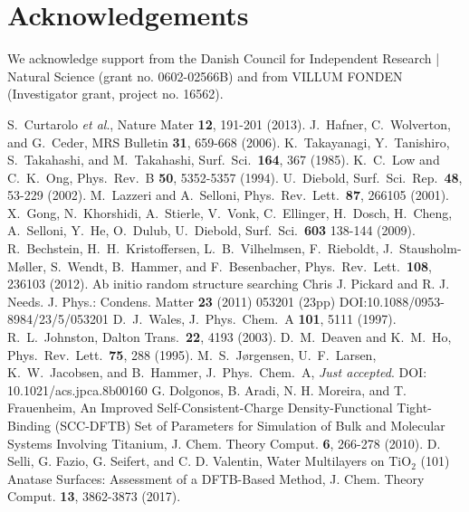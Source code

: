 \documentclass[aip,amsmath,amssymb,reprint]{revtex4-1}
\begin{document}
\section{Acknowledgements}

We acknowledge support from the Danish Council for Independent Research | Natural Science (grant no. 0602-02566B) and from VILLUM FONDEN (Investigator grant, project no. 16562).

\begin{thebibliography}{12}  
 S.\ Curtarolo \textit{et al}., Nature Mater \textbf{12}, 191-201 (2013).
 J.\ Hafner, C.\ Wolverton, and G.\ Ceder, MRS Bulletin \textbf{31}, 659-668 (2006).
K.\ Takayanagi, Y.\ Tanishiro, S.\ Takahashi, and M.\ Takahashi, Surf.\ Sci.\ \textbf{164}, 367 (1985).
K.\ C.\ Low and C.\ K.\ Ong, Phys.\ Rev.\ B \textbf{50}, 5352-5357 (1994).
U.\ Diebold, Surf.\ Sci.\ Rep.\ \textbf{48}, 53-229 (2002).
M.\ Lazzeri and A.\ Selloni, Phys.\ Rev.\ Lett.\ \textbf{87}, 266105 (2001).
X.\ Gong, N.\ Khorshidi, A.\ Stierle, V.\ Vonk, C.\ Ellinger, H.\ Dosch, H.\ Cheng, A.\ Selloni, Y.\ He, O.\ Dulub, U.\ Diebold, Surf.\ Sci.\ \textbf{603} 138-144 (2009).
R.\ Bechstein, H.\ H.\ Kristoffersen, L.\ B.\ Vilhelmsen, F.\ Rieboldt, J.\ Stausholm-M{\o}ller, S.\ Wendt, B.\ Hammer, and F.\ Besenbacher, Phys.\ Rev.\ Lett.\ \textbf{108}, 236103 (2012).
  {Ab initio random structure searching} Chris J. Pickard and R. J. Needs. J. Phys.: Condens. Matter \textbf{23} (2011) 053201 (23pp) DOI:10.1088/0953-8984/23/5/053201
D.\ J.\ Wales, J.\ Phys.\ Chem.\ A \textbf{101}, 5111 (1997).
R.\ L.\ Johnston, Dalton Trans.\ \textbf{22}, 4193 (2003).
D.\ M.\ Deaven and K.\ M.\ Ho, Phys.\ Rev.\ Lett.\ \textbf{75}, 288 (1995).
M.\ S.\ J{\o}rgensen, U.\ F.\ Larsen, K.\ W.\ Jacobsen, and B.\ Hammer, J.\ Phys.\ Chem.\ A, \textit{Just accepted}. DOI: 10.1021/acs.jpca.8b00160
G. Dolgonos, B. Aradi, N. H. Moreira, and T. Frauenheim, {An Improved Self-Consistent-Charge Density-Functional Tight-Binding (SCC-DFTB) Set of Parameters for Simulation of Bulk and Molecular Systems Involving Titanium}, J. Chem. Theory Comput. \textbf{6}, 266-278 (2010).
D. Selli, G. Fazio, G. Seifert, and C. D. Valentin, {Water Multilayers on TiO$_2$ (101) Anatase Surfaces: Assessment of a DFTB-Based Method}, J. Chem. Theory Comput. \textbf{13}, 3862-3873 (2017).

\end{thebibliography}
\end{document}
